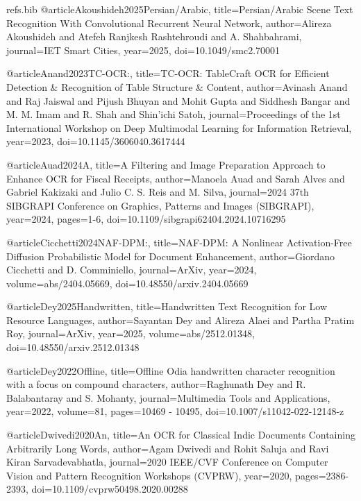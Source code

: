
\begin{filecontents}{refs.bib}
    @article{Akoushideh2025Persian/Arabic,
    title={Persian/Arabic Scene Text Recognition With Convolutional Recurrent Neural Network},
    author={Alireza Akoushideh and Atefeh Ranjkesh Rashtehroudi and A. Shahbahrami},
    journal={IET Smart Cities},
    year={2025},
    doi={10.1049/smc2.70001}
    }
    
    @article{Anand2023TC-OCR:,
    title={TC-OCR: TableCraft OCR for Efficient Detection & Recognition of Table Structure & Content},
    author={Avinash Anand and Raj Jaiswal and Pijush Bhuyan and Mohit Gupta and Siddhesh Bangar and M. M. Imam and R. Shah and Shin’ichi Satoh},
    journal={Proceedings of the 1st International Workshop on Deep Multimodal Learning for Information Retrieval},
    year={2023},
    doi={10.1145/3606040.3617444}
    }
    
    @article{Auad2024A,
    title={A Filtering and Image Preparation Approach to Enhance OCR for Fiscal Receipts},
    author={Manoela Auad and Sarah Alves and Gabriel Kakizaki and Julio C. S. Reis and M. Silva},
    journal={2024 37th SIBGRAPI Conference on Graphics, Patterns and Images (SIBGRAPI)},
    year={2024},
    pages={1-6},
    doi={10.1109/sibgrapi62404.2024.10716295}
    }
    
    @article{Cicchetti2024NAF-DPM:,
    title={NAF-DPM: A Nonlinear Activation-Free Diffusion Probabilistic Model for Document Enhancement},
    author={Giordano Cicchetti and D. Comminiello},
    journal={ArXiv},
    year={2024},
    volume={abs/2404.05669},
    doi={10.48550/arxiv.2404.05669}
    }
    
    @article{Dey2025Handwritten,
    title={Handwritten Text Recognition for Low Resource Languages},
    author={Sayantan Dey and Alireza Alaei and Partha Pratim Roy},
    journal={ArXiv},
    year={2025},
    volume={abs/2512.01348},
    doi={10.48550/arxiv.2512.01348}
    }
    
    @article{Dey2022Offline,
    title={Offline Odia handwritten character recognition with a focus on compound characters},
    author={Raghunath Dey and R. Balabantaray and S. Mohanty},
    journal={Multimedia Tools and Applications},
    year={2022},
    volume={81},
    pages={10469 - 10495},
    doi={10.1007/s11042-022-12148-z}
    }
    
    @article{Dwivedi2020An,
    title={An OCR for Classical Indic Documents Containing Arbitrarily Long Words},
    author={Agam Dwivedi and Rohit Saluja and Ravi Kiran Sarvadevabhatla},
    journal={2020 IEEE/CVF Conference on Computer Vision and Pattern Recognition Workshops (CVPRW)},
    year={2020},
    pages={2386-2393},
    doi={10.1109/cvprw50498.2020.00288}
    }
    

\end{filecontents}
